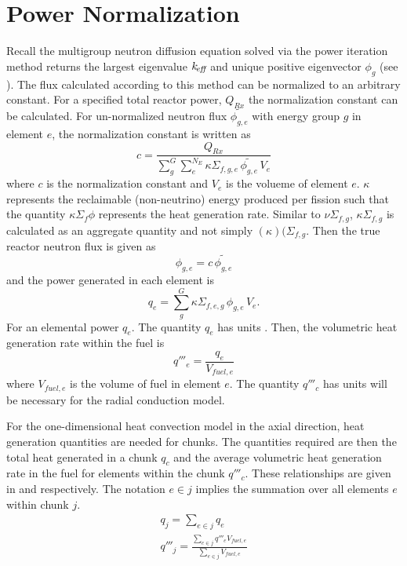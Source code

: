 \section{Power Normalization}
  Recall the multigroup neutron diffusion equation solved via the power
  iteration method returns the largest eigenvalue $k_{\!\mbox{\scriptsize \em eff}}$ and unique positive
  eigenvector $\phi_g$ (see ). The flux calculated
  according to this method can be normalized to an arbitrary constant. For a
  specified total reactor power, $Q_{Rx}$ the normalization constant can be 
  calculated. For un-normalized neutron flux $\widetilde{\phi_{g,e}}$ with
  energy group $g$ in element $e$, the normalization constant is written as
  \begin{equation}
    \label{eq:normalization_c}
    c = \frac{Q_{Rx}}{\sum_{g}^{G} \sum_{e}^{N_E} \kappa \Sigma_{f,g,e} \,
      \widetilde{\phi_{g,e}} \, V_e}
  \end{equation}
  where $c$ is the normalization constant and $V_e$ is the volueme of element
  $e$. $\kappa$ represents the reclaimable
  (non-neutrino) energy produced per fission such that the quantity $\kappa
  \Sigma_f \phi$ represents the heat generation rate. Similar to
  $\nu\Sigma_{f,g}$, $\kappa\Sigma_{f,g}$ is calculated as an aggregate
  quantity and not simply $(\kappa)(\Sigma_{f,g}$. Then the true reactor
  neutron flux is given as
  \begin{equation}
    \label{eq:normalization_phi}
    \phi_{g,e} = c \, \widetilde{\phi_{g,e}}
  \end{equation}
  and the power generated in each element is 
  \begin{equation}
    \label{eq:elementpwr}
    q_{e} = \sum_g^G \kappa \Sigma_{f,e,g} \, \phi_{g,e} \, V_e .
  \end{equation}
  For an elemental power $q_e$. The quantity $q_e$ has units . Then,
  the volumetric heat generation rate within the fuel is 
  \begin{equation}
    \label{eq:elementqppp_fuel}
    q'''_{e} = \frac{q_e}{V_{fuel,e}}
  \end{equation}
  where $V_{fuel,e}$ is the volume of fuel in element $e$. The quantity $q'''_c$
  has units  will be necessary for the 
  radial conduction model.

  For the one-dimensional heat convection model in the axial direction,
  heat generation quantities are needed for chunks.
  The quantities required are then the total heat generated in a chunk $q_c$ and
  the average volumetric heat generation rate in the fuel for elements within
  the chunk $q'''_c$. These relationships are given in  and
   respectively. The notation $e \in j$ implies the
  summation over all elements $e$ within chunk $j$.
  \begin{align}
    \label{eq:chunkpwr}
    q_j = \sum_{e \in j} q_e \\
    \label{eq:chunkqppp_fuel}
    q'''_j = \frac{\sum_{e \in j} q'''_e V_{fuel,e}}{\sum_{e \in j} V_{fuel,e}}
  \end{align}

